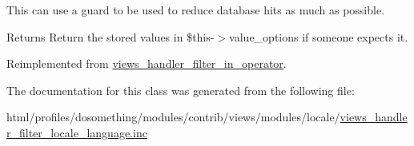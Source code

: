 This can use a guard to be used to reduce database hits as much as possible.

\begin{DoxyReturn}{Returns}
Return the stored values in \$this-\/$>$value\_\-options if someone expects it. 
\end{DoxyReturn}


Reimplemented from \hyperlink{classviews__handler__filter__in__operator_aa5b5df6d90f4359ed28c0c446bdc81a6}{views\_\-handler\_\-filter\_\-in\_\-operator}.

The documentation for this class was generated from the following file:\begin{DoxyCompactItemize}
\item 
html/profiles/dosomething/modules/contrib/views/modules/locale/\hyperlink{views__handler__filter__locale__language_8inc}{views\_\-handler\_\-filter\_\-locale\_\-language.inc}\end{DoxyCompactItemize}
